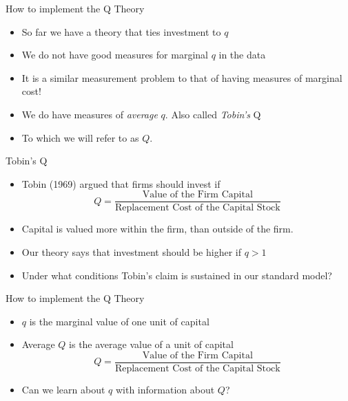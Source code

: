 \documentclass[11pt,aspectratio=169,xcolor={dvipsnames},hyperref={pdftex,pdfpagemode=UseNone,hidelinks,pdfdisplaydoctitle=true},usepdftitle=false]{beamer}
\begin{document}
\begin{frame}{How to implement the Q Theory}
\begin{itemize}
\item So far we have a theory that ties investment to $q$
\pause
\item We do not have good measures for marginal $q$ in the data
\pause
\item It is a similar measurement problem to that of having measures of marginal cost!
\pause
\item We do have measures of \textit{average} $q$. Also called \textit{Tobin's} Q
\item To which we will refer to as $Q$.
\end{itemize}
\end{frame}

\begin{frame}{Tobin's Q}
\begin{itemize}
\item Tobin (1969) argued that firms should invest if 
$$Q = \frac{\text{Value of the Firm Capital}}{\text{Replacement Cost of the Capital Stock}}$$
\item Capital is valued more within the firm, than outside of the firm.
\pause
\item Our theory says that investment should be higher if $q>1$
\pause
\item Under what conditions Tobin's claim is sustained in our standard model?
\end{itemize}
\end{frame}


\begin{frame}{How to implement the Q Theory}
\begin{itemize}
\item $q$ is the marginal value of one unit of capital
\pause
\item Average $Q$ is the average value of a unit of capital
$$Q = \frac{\text{Value of the Firm Capital}}{\text{Replacement Cost of the Capital Stock}}$$
\pause
\item Can we learn about $q$ with information about $Q$?
\end{itemize}
\end{frame}
\end{document}
